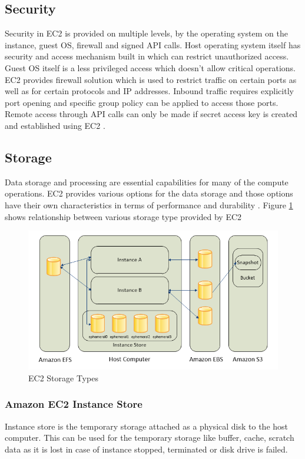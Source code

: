 \subsection{Security}
Security in EC2 is provided on multiple levels, by the operating system on the instance, guest OS, firewall and signed API calls. Host operating system itself has security and access mechanism built in which can restrict unauthorized access. Guest OS itself is a less privileged access which doesn't allow critical operations. EC2 provides firewall solution which is used to restrict traffic on certain ports as well as for certain protocols and IP addresses. Inbound traffic requires explicitly port opening and specific group policy can be applied to access those ports. Remote access through API calls can only be made if secret access key is created and established using EC2 \cite{www-aws-ec2Security}.

\subsection{Storage}
Data storage and processing are essential capabilities for many of the compute operations. EC2 provides various options for the data storage and those options have their own characteristics in terms of performance and durability \cite{www-aws-ec2Storage}. Figure \ref{f:ec2-storage} shows relationship between various storage type provided by EC2
\begin{figure}[!ht]
  \centering\includegraphics[width=\columnwidth]{images/ec2Storage.PNG}
  \caption{EC2 Storage Types \cite{www-aws-ec2Storage}}\label{f:ec2-storage}
\end{figure}

\subsubsection{Amazon EC2 Instance Store} 
Instance store \cite{www-aws-ec2Storage} is the temporary storage attached as a physical disk to the host computer. This can be used for the temporary storage like buffer, cache, scratch data as it is lost in case of instance stopped, terminated or disk drive is failed.
